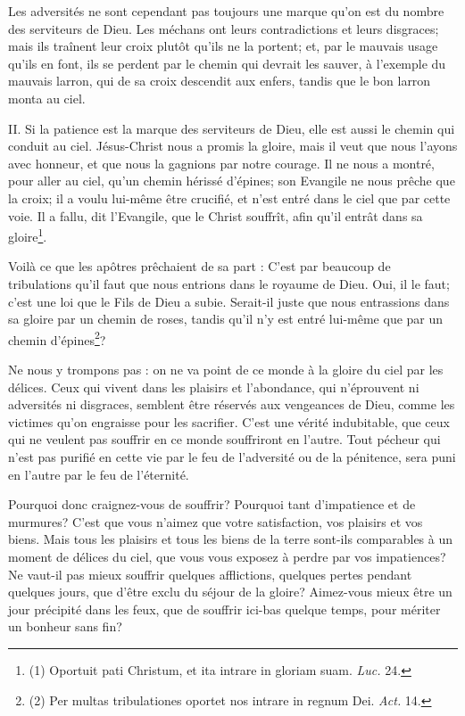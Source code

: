 \documentclass[instructions.tex]{subfiles}
\begin{document}
Les adversités ne sont cependant pas toujours une marque qu'on est du nombre des serviteurs de Dieu. Les méchans ont leurs contradictions et leurs disgraces; mais ils traînent leur croix plutôt qu'ils ne la portent; et, par le mauvais usage qu'ils en font, ils se perdent par le chemin qui devrait les sauver, à l'exemple du mauvais larron, qui de sa croix descendit aux enfers, tandis que le bon larron monta au ciel.
 
II. Si la patience est la marque des serviteurs de Dieu, elle est aussi le chemin qui conduit au ciel. Jésus-Christ nous a promis la gloire, mais il veut que nous l'ayons avec honneur, et que nous la gagnions par notre courage. Il ne nous a montré, pour aller au ciel, qu'un chemin hérissé d'épines; son Evangile ne nous prêche que la croix; il a voulu lui-même être crucifié, et n'est entré dans le ciel que par cette voie. Il a fallu, dit l'Evangile, que le Christ souffrît, afin qu'il entrât dans sa gloire\footnote{(1) Oportuit pati Christum, et ita intrare in gloriam suam. \textit{Luc.} 24.}.
 
Voilà ce que les apôtres prêchaient de sa part : C'est par beaucoup de tribulations qu'il faut que nous entrions dans le royaume de Dieu. Oui, il le faut; c'est une loi que le Fils de Dieu a subie. Serait-il juste que nous entrassions dans sa gloire par un chemin de roses, tandis qu'il n'y est entré lui-même que par un chemin d'épines\footnote{(2) Per multas tribulationes oportet nos intrare in regnum Dei. \textit{Act.} 14.}?
 
Ne nous y trompons pas : on ne va point de ce monde à la gloire du ciel par les délices. Ceux qui vivent dans les plaisirs et l'abondance, qui n'éprouvent ni adversités ni disgraces, semblent être réservés aux vengeances de Dieu, comme les victimes qu'on engraisse pour les sacrifier. C'est une vérité indubitable, que ceux qui ne veulent pas souffrir en ce monde souffriront en l'autre. Tout pécheur qui n'est pas purifié en cette vie par le feu de l'adversité ou de la pénitence, sera puni en l'autre par le feu de l'éternité.
 
Pourquoi donc craignez-vous de souffrir? Pourquoi tant d'impatience et de murmures? C'est que vous n'aimez que votre satisfaction, vos plaisirs et vos biens. Mais tous les plaisirs et tous les biens de la terre sont-ils comparables à un moment de délices du ciel, que vous vous exposez à perdre par vos impatiences? Ne vaut-il pas mieux souffrir quelques afflictions, quelques pertes pendant quelques jours, que d'être exclu du séjour de la gloire? Aimez-vous mieux être un jour précipité dans les feux, que de souffrir ici-bas quelque temps, pour mériter un bonheur sans fin?
 
\end{document}
